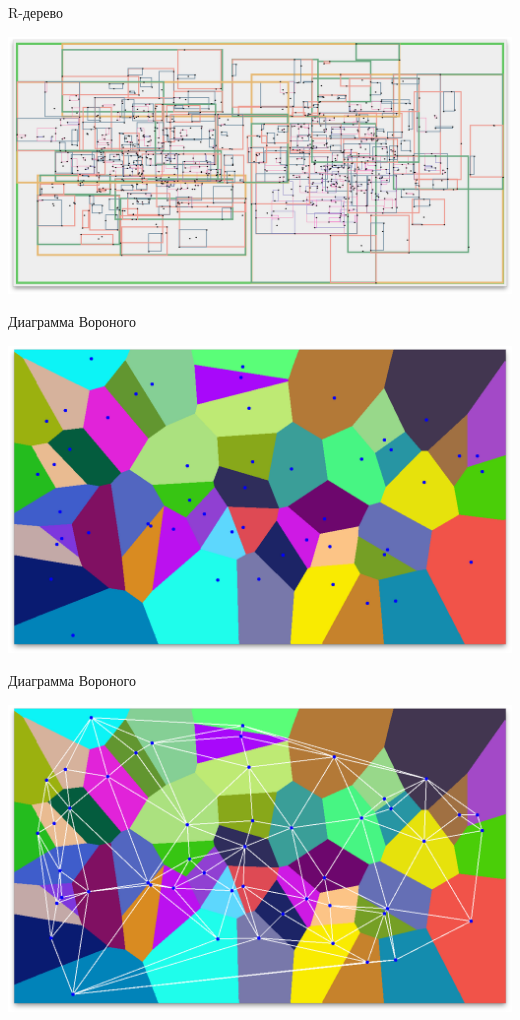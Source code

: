 \documentclass[14pt, fleqn, xcolor={dvipsnames, table}]{beamer}
\begin{document}
        \begin{frame}{R-дерево}
            \begin{center}
	            \includegraphics[scale = 0.25]{r-tree.png}
	        \end{center}  
        \end{frame}
        
        \begin{frame}{Диаграмма Вороного}
            \begin{center}
	            \includegraphics[scale=0.295]{voronoi-1.png}
	        \end{center}       
        \end{frame}
        
        \begin{frame}{Диаграмма Вороного}
            \begin{center}
	            \includegraphics[scale=0.295]{voronoi-2.png}
	        \end{center}       
        \end{frame}
        
\end{document}
